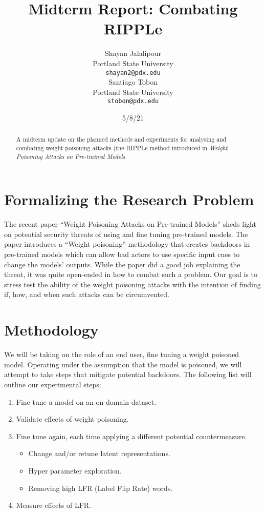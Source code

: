 \documentclass[11pt,a4paper]{article}
\title{Midterm Report: Combating RIPPLe}
\author{Shayan Jalalipour \\
  Portland State University\\
  \texttt{shayan2@pdx.edu} \\\And
  Santiago Tobon \\
  Portland State University \\
  \texttt{stobon@pdx.edu} \\}
\date{5/8/21}
\begin{document}
\maketitle
\begin{abstract}
A midterm update on the planned methods and experiments for analysing and combating weight poisoning attacks (the RIPPLe method introduced in \emph{Weight Poisoning Attacks on Pre-trained Models} \cite{ripple}
\end{abstract}


\section{Formalizing the Research Problem}

The recent paper “Weight Poisoning Attacks on Pre-trained Models” sheds light on potential security threats of using and fine tuning pre-trained models. \cite{ripple} The paper introduces a “Weight poisoning” methodology that creates backdoors in pre-trained models which can allow bad actors to use specific input cues to change the models’ outputs.
While the paper did a good job explaining the threat, it was quite open-ended in how to combat such a problem. Our goal is to stress test the ability of the weight poisoning attacks with the intention of finding if, how, and when such attacks can be circumvented.


\section{Methodology}

We will be taking on the role of an end user, fine tuning a weight poisoned model. Operating under the assumption that the model is poisoned, we will attempt to take steps that mitigate potential backdoors. The following list will outline our experimental steps:

\begin{enumerate}
    \item Fine tune a model on an on-domain dataset.
    \item Validate effects of weight poisoning.
    \item Fine tune again, each time applying a different potential countermeasure.
    \begin{itemize}
        \item Change and/or retune latent representations.
        \item Hyper parameter exploration.
        \item Removing high LFR (Label Flip Rate) words.
    \end{itemize}
    \item Measure effects of LFR.
\end{enumerate}
\end{document}
